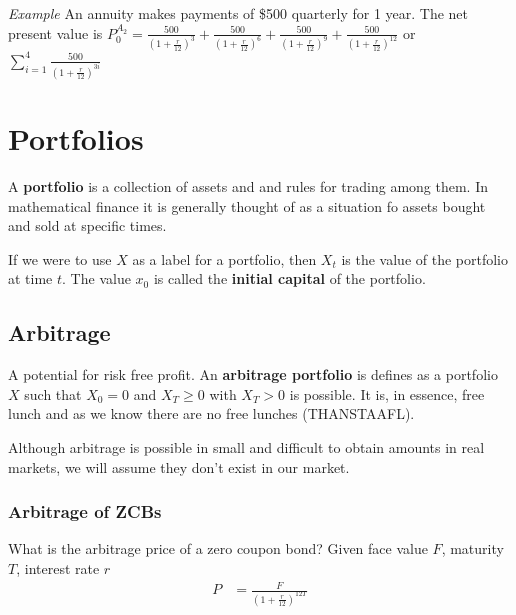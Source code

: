 \documentclass[12pt,letterpaper, twocolumn]{article}
\begin{document}
\textit{Example}
An annuity makes payments of \$500 quarterly for 1 year. The net present value is $P_0^{A_2}= \frac{500}{(1+\frac{r}{12})^3} + \frac{500}{(1+\frac{r}{12})^6} + \frac{500}{(1+\frac{r}{12})^9} + \frac{500}{(1+\frac{r}{12})^{12}}$ or $\sum_{i=1}^{4}\frac{500}{(1+\frac{r}{12})^{3i}}$

\section{Portfolios}
A \textbf{portfolio} is a collection of assets and and rules for trading among them. In mathematical finance it is generally thought of as a situation fo assets bought and sold at specific times. 

If we were to use $X$ as a label for a portfolio, then $X_t$ is the value of the portfolio at time $t$. The value $x_0$ is called the \textbf{initial capital} of the portfolio. 

\subsection{Arbitrage}
A potential for risk free profit. 
An \textbf{arbitrage portfolio} is defines as a portfolio $X$ such that $X_0 = 0$ and $X_T \geq 0$ with $X_T > 0$ is possible. It is, in essence, free lunch and as we know there are no free lunches (THANSTAAFL). 

Although arbitrage is possible in small and difficult to obtain amounts in real markets, we will assume they don't exist in our market. 

\subsubsection{Arbitrage of ZCBs}
What is the arbitrage price of a zero coupon bond? Given face value $F$, maturity $T$, interest rate $r$
\begin{align*}P&=\frac{F}{(1+\frac{r}{12})^{12T}}\end{align*}
\end{document}
